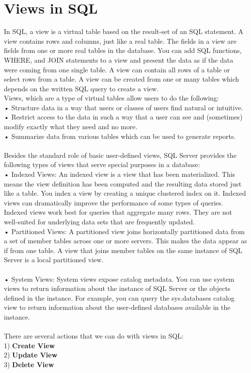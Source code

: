 \section{Views in SQL}

In SQL, a view is a virtual table based on the result-set of an SQL statement.
A view contains rows and columns, just like a real table. The fields in a view are fields from one or more real tables in the database.
You can add SQL functions, WHERE, and JOIN statements to a view and present the data as if the data were coming from one single table.
A view can contain all rows of a table or select rows from a table. A view can be created from one or many tables which depends on the written SQL query to create a view.\\
Views, which are a type of virtual tables allow users to do the following:\\
•	Structure data in a way that users or classes of users find natural or intuitive.\\
•	Restrict access to the data in such a way that a user can see and (sometimes) modify exactly what they need and no more.\\
•	Summarize data from various tables which can be used to generate reports.\\
\\
Besides the standard role of basic user-defined views, SQL Server provides the following types of views that serve special purposes in a database:\\
{\large • Indexed Views:}
An indexed view is a view that has been materialized. This means the view definition has been computed and the resulting data stored just like a table. You index a view by creating a unique clustered index on it. Indexed views can dramatically improve the performance of some types of queries. Indexed views work best for queries that aggregate many rows. They are not well-suited for underlying data sets that are frequently updated.\\
{\large • Partitioned Views:}
A partitioned view joins horizontally partitioned data from a set of member tables across one or more servers. This makes the data appear as if from one table. A view that joins member tables on the same instance of SQL Server is a local partitioned view.\\
\\
{\large • System Views:}
System views expose catalog metadata. You can use system views to return information about the instance of SQL Server or the objects defined in the instance. For example, you can query the sys.databases catalog view to return information about the user-defined databases available in the instance.\\
\\
\clearpage
There are several actions that we can do with views in SQL:\\
1) \textbf{Create View}\\
2) \textbf{Update View}\\
3) \textbf{Delete View}\\

